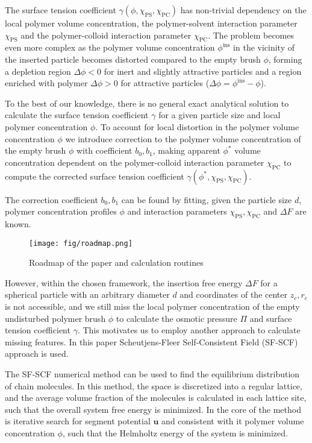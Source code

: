 \documentclass[10pt, a4paper]{article}
\begin{document}
\begin{multicols}{2}
The surface tension coefficient $\gamma(\phi, \chi_{\textrm{PS}}, \chi_{\textrm{PC}})$ has non-trivial dependency on the local polymer volume concentration, the polymer-solvent interaction parameter $\chi_{\textrm{PS}}$ and the polymer-colloid interaction parameter $\chi_{\textrm{PC}}$.
The problem becomes even more complex as the polymer volume concentration $\phi^{\textrm{ins}}$ in the vicinity of the inserted particle becomes distorted compared to the empty brush $\phi$, forming a depletion region $\Delta \phi <0$ for inert and slightly attractive particles and a region enriched with polymer $\Delta \phi >0$ for attractive particles ($\Delta \phi = \phi^{\textrm{ins}} - \phi$).

To the best of our knowledge, there is no general exact analytical solution to calculate the surface tension coefficient $\gamma$ for a given particle size and local polymer concentration $\phi$.
To account for local distortion in the polymer volume concentration $\phi$ we introduce correction to the polymer volume concentration of the empty brush $\phi$ with coefficient $b_0, b_1$, making apparent $\phi^{\ast}$ volume concentration dependent on the polymer-colloid interaction parameter $\chi_{\textrm{PC}}$ to compute the corrected surface tension coefficient $\gamma(\phi^{\ast},\chi_{\textrm{PS}}, \chi_{\textrm{PC}})$.

The correction coefficient $b_0, b_1$ can be found by fitting, given the particle size $d$, polymer concentration profiles $\phi$ and interaction parameters $\chi_{\textrm{PS}}, \chi_{\textrm{PC}}$ and $\Delta F$ are known.

\begin{figure}[H]
    \texttt{[image: fig/roadmap.png]}
    \caption{Roadmap of the paper and calculation routines}
    \label{fig:paper_roadmap}
\end{figure}

However, within the chosen framework, the insertion free energy $\Delta F$ for a spherical particle with an arbitrary diameter $d$ and coordinates of the center $z_c, r_c$ is not accessible, and we still miss the local polymer concentration of the empty undisturbed polymer brush $\phi$ to calculate the osmotic pressure $\Pi$ and surface tension coefficient $\gamma$.
This motivates us to employ another approach to calculate missing features. 
In this paper Scheutjens-Fleer Self-Consistent Field (SF-SCF) approach is used.

The SF-SCF numerical method can be used to find the equilibrium distribution of chain molecules.
In this method, the space is discretized into a regular lattice, and the average volume fraction of the molecules is calculated in each lattice site, such that the overall system free energy is minimized.
In the core of the method is iterative search for segment potential $\mathbf{u}$ and consistent with it polymer volume concentration $\phi$, such that the Helmholtz energy of the system is minimized.


\end{multicols}
\end{document}
